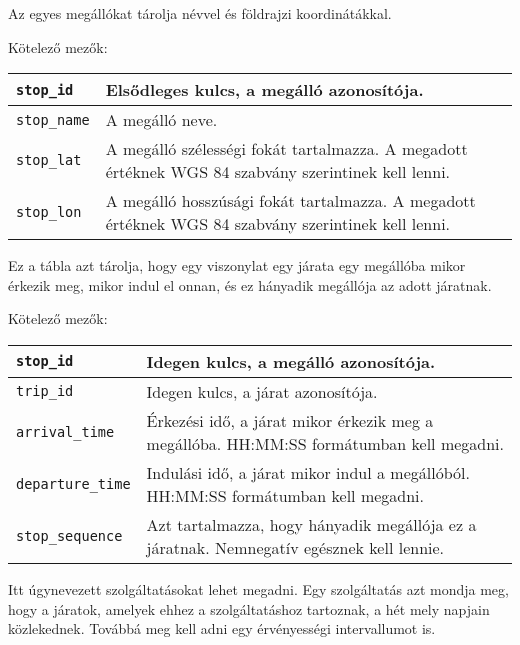 
Az egyes megállókat tárolja névvel és földrajzi koordinátákkal.

\medskip

\noindent Kötelező mezők:

\bigskip

\begin{tabular}{|p{3cm}|p{10cm}|}
\hline
\texttt{stop\_id} & Elsődleges kulcs, a megálló azonosítója. \\
\hline
\texttt{stop\_name} & A megálló neve. \\
\hline
\texttt{stop\_lat} & A megálló szélességi fokát tartalmazza. A megadott értéknek WGS 84 szabvány szerintinek kell lenni. \\
\hline
\texttt{stop\_lon} & A megálló hosszúsági fokát tartalmazza. A megadott értéknek WGS 84 szabvány szerintinek kell lenni. \\
\hline
\end{tabular}


Ez a tábla azt tárolja, hogy egy viszonylat egy járata egy megállóba mikor érkezik meg, mikor indul el onnan, és ez hányadik megállója az adott járatnak.

\medskip

\noindent Kötelező mezők:

\bigskip

\begin{tabular}{|p{3.5cm}|p{9.5cm}|}
\hline
\texttt{stop\_id} & Idegen kulcs, a megálló azonosítója. \\
\hline
\texttt{trip\_id} & Idegen kulcs, a járat azonosítója. \\
\hline
\texttt{arrival\_time} & Érkezési idő, a járat mikor érkezik meg a megállóba. HH:MM:SS formátumban kell megadni. \\
\hline
\texttt{departure\_time} & Indulási idő, a járat mikor indul a megállóból. HH:MM:SS formátumban kell megadni. \\
\hline
\texttt{stop\_sequence} & Azt tartalmazza, hogy hányadik megállója ez a járatnak. Nemnegatív egésznek kell lennie. \\
\hline
\end{tabular}


Itt úgynevezett szolgáltatásokat lehet megadni. Egy szolgáltatás azt mondja meg, hogy a járatok, amelyek ehhez a szolgáltatáshoz tartoznak, a hét mely napjain közlekednek. Továbbá meg kell adni egy érvényességi intervallumot is.

